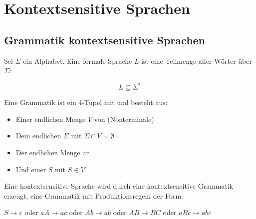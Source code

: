 \documentclass{bschlangaul-theorie}
\begin{document}

\chapter{Kontextsensitive Sprachen}

\begin{bQuellen}
\item \cite[Seite 191-192]{hoffmann}
\end{bQuellen}

%

\section{Grammatik kontextsensitive Sprachen}

Sei $\Sigma$ ein Alphabet. Eine formale Sprache $L$ ist eine Teilmenge
aller Wörter über $\Sigma$:

\begin{displaymath}
L \subseteq \Sigma^*
\end{displaymath}

\bigskip

\noindent
Eine Grammatik ist ein 4-Tupel mit \bGrammatik{} und besteht aus:

\begin{itemize}
\item Einer endlichen Menge $V$ von  (Nonterminale)

\item Dem endlichen  $\Sigma$ mit $\Sigma \cap V
= \emptyset$

\item Der endlichen Menge an 

\item Und einer  $S$ mit $S \in V$
\end{itemize}

Eine kontextsensitive Sprache wird durch eine kontextsensitive
Grammatik erzeugt, \dh eine Grammatik mit Produktionsregeln der
Form:

$S \rightarrow \varepsilon$ oder
$aA \rightarrow ac$ oder
$Ab \rightarrow ab$ oder
$AB \rightarrow BC$ oder
$aBc \rightarrow abc$
\end{document}
